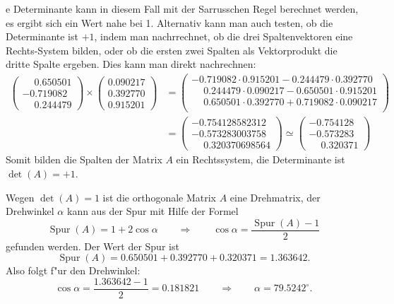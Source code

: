 \begin{loesung}
\begin{teilaufgaben}
e Determinante kann in diesem Fall mit der Sarrusschen Regel
berechnet werden, es ergibt sich ein Wert nahe bei 1.
Alternativ kann man auch testen, ob die Determinante ist $+1$,
indem man nachrrechnet, ob die drei Spaltenvektoren eine
Rechts-System bilden, oder ob die ersten zwei Spalten als Vektorprodukt
die dritte Spalte ergeben. Dies kann man direkt nachrechnen:
\begin{align*}
\begin{pmatrix}
\phantom{-}0.650501\\
  -0.719082\\
\phantom{-}0.244479
\end{pmatrix}
\times
\begin{pmatrix}
0.090217\\
0.392770\\
0.915201
\end{pmatrix}
&=
\begin{pmatrix}
-0.719082\cdot 0.915201 - 0.244479\cdot 0.392770\\
\phantom{-}0.244479\cdot 0.090217 - 0.650501\cdot 0.915201\\
\phantom{-}0.650501\cdot 0.392770 + 0.719082\cdot 0.090217\\
\end{pmatrix}
\\
&=
\begin{pmatrix}
%
-0.754128582312\\
-0.573283003758\\
\phantom{-}0.320370698564
\end{pmatrix}
\simeq
\begin{pmatrix}
-0.754128\\
-0.573283\\
\phantom{-}0.320371
\end{pmatrix}
\end{align*}
Somit bilden die Spalten der Matrix $A$ ein Rechtssystem, die Determinante
ist $\det(A)=+1$.
\item Wegen $\det(A)=1$ ist die orthogonale Matrix $A$ eine Drehmatrix,
der Drehwinkel $\alpha$ kann aus der Spur mit Hilfe der Formel
\[
\operatorname{Spur}(A)=1+2\cos\alpha\qquad\Rightarrow\qquad
\cos\alpha=\frac{\operatorname{Spur}(A)-1}2
\]
gefunden werden. Der Wert der Spur ist
\[
\operatorname{Spur}(A) = 0.650501  + 0.392770  + 0.320371 = 1.363642.
\]
Also folgt f"ur den Drehwinkel:
\[
\cos\alpha=\frac{1.363642-1}2= 0.181821\qquad\Rightarrow\qquad
\alpha=79.5242^\circ.
\]
\end{teilaufgaben}
\end{loesung}

